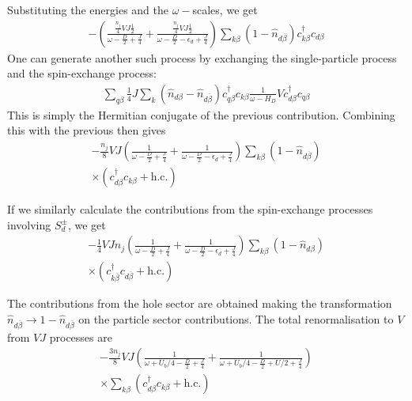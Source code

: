 \documentclass[reprint,superscriptaddress,floatfix]{revtex4-2}
\begin{document}
Substituting the energies and the \(\omega-\)scales, we get
\begin{equation}\begin{aligned}
	-\left(\frac{\frac{n_j}{4}V J \frac{1}{2}}{\omega - \frac{D}{2} + \frac{J}{4}} + \frac{\frac{n_j}{4}V J \frac{1}{2}}{\omega - \frac{D}{2} - \epsilon_d + \frac{J}{4}}\right)\sum_{k\beta}\left(1 - \hat n_{d\overline\beta}\right) c^\dagger_{k\beta} c_{d\beta}
\end{aligned}\end{equation}
One can generate another such process by exchanging the single-particle process and the spin-exchange process:
\begin{equation}\begin{aligned}
	\sum_{q\beta} \frac{1}{4}J \sum_{k} \left(\hat n_{d\beta} - \hat n_{d\overline\beta}\right) c^\dagger_{q\beta}c_{k\beta} \frac{1}{\omega - H_D} V c^\dagger_{d\beta} c_{q\beta}
\end{aligned}\end{equation}
This is simply the Hermitian conjugate of the previous contribution. Combining this with the previous then gives
\begin{equation}\begin{aligned}
	-\frac{n_j}{8}V J \left(\frac{1}{\omega - \frac{D}{2} + \frac{J}{4}} + \frac{1}{\omega - \frac{D}{2} - \epsilon_d + \frac{J}{4}}\right) \sum_{k\beta}\left(1 - \hat n_{d\overline\beta}\right)\\
	\times \left(c^\dagger_{d\beta} c_{k\beta} + \text{h.c.}\right)
\end{aligned}\end{equation}

If we similarly calculate the contributions from the spin-exchange processes involving \(S_d^\pm\), we get
\begin{equation}\begin{aligned}
	-\frac{1}{4}V J n_j \left(\frac{1}{\omega - \frac{D}{2} + \frac{J}{4}} + \frac{1}{\omega - \frac{D}{2} - \epsilon_d + \frac{J}{4}}\right) \sum_{k\beta} \left(1 - \hat n_{d\beta}\right)\\
	\times \left(c^\dagger_{k\overline\beta} c_{d\overline\beta} + \text{h.c.}\right)
\end{aligned}\end{equation}

The contributions from the hole sector are obtained making the transformation \(\hat n_{d\overline\beta} \to 1 - \hat n_{d\overline\beta}\) on the particle sector contributions. The total renormalisation to \(V\) from \(VJ\) processes are
\begin{equation}\begin{aligned}
	-\frac{3n_j}{8}V J \left(\frac{1}{\omega +U_b/4 - \frac{D}{2} + \frac{J}{4}} + \frac{1}{\omega +U_b/4 - \frac{D}{2} + U/2 + \frac{J}{4}}\right)\\
	\times\sum_{k\beta}\left(c^\dagger_{d\beta} c_{k\beta} + \text{h.c.}\right)
\end{aligned}\end{equation}
\end{document}
